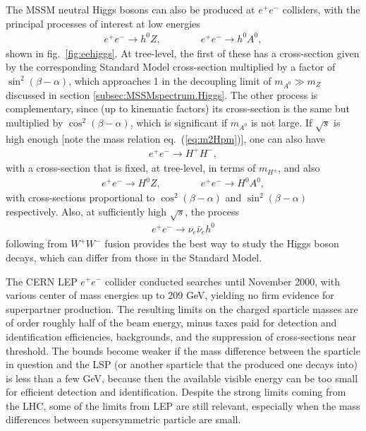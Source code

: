 \documentclass[12pt]{article}
\def\beq{\begin{eqnarray}}
\def\eeq{\end{eqnarray}}
\begin{document}
The MSSM neutral Higgs bosons can also be produced at $e^+e^-$ colliders,
with the principal processes of interest at low energies
\beq
e^+e^- \rightarrow h^0 Z,
\qquad\qquad
e^+e^-\rightarrow h^0A^0,
\eeq
shown in fig.~\ref{fig:eehiggs}. At tree-level, the first of these has a 
cross-section given by the corresponding Standard Model cross-section 
multiplied by a factor of $\sin^2(\beta - \alpha)$, which approaches 1 in 
the decoupling limit of $m_{A^0} \gg m_Z$ discussed in section 
\ref{subsec:MSSMspectrum.Higgs}. The other process is complementary, since 
(up to kinematic factors) its cross-section is the same but multiplied 
by $\cos^2(\beta - \alpha)$, which is significant if $m_{A^0}$ is not 
large. If $\sqrt{s}$ is high enough [note the mass relation 
eq.~(\ref{eq:m2Hpm})], one can also have
\beq
e^+e^-\rightarrow H^+ H^-,
\eeq
with a cross-section that is fixed, at tree-level, in terms of 
$m_{H^\pm}$, and also
\beq
e^+e^- \rightarrow H^0Z,
\qquad\qquad
e^+e^-\rightarrow H^0A^0,
\eeq
with cross-sections proportional to $\cos^2(\beta - \alpha)$ and 
$\sin^2(\beta - \alpha)$ respectively. Also, at sufficiently high 
$\sqrt{s}$, the process
\beq
e^+ e^- \rightarrow \nu_e \bar \nu_e h^0 
\eeq
following from $W^+W^-$ fusion provides the best way to study the Higgs 
boson decays, which can differ \cite{GunionHaber,HHG,Haber:1997dt} 
from those in the Standard Model.

The CERN LEP $e^+e^-$ collider conducted searches until November 2000, 
with various center of mass energies up to 209 GeV, yielding no firm 
evidence for superpartner production. The resulting limits 
\cite{LEPSUSYWG} on the charged sparticle masses are of order roughly half 
of the beam energy, minus taxes paid for detection and identification 
efficiencies, backgrounds, and the suppression of cross-sections near 
threshold. The bounds become weaker if the mass difference between the 
sparticle in question and the LSP (or another sparticle that the produced 
one decays into) is less than a few GeV, because then the available 
visible energy can be too small for efficient detection and identification.
Despite the strong limits coming from the LHC, some of the limits from LEP are still relevant, especially when the mass differences between supersymmetric particle
are small.
\end{document}

